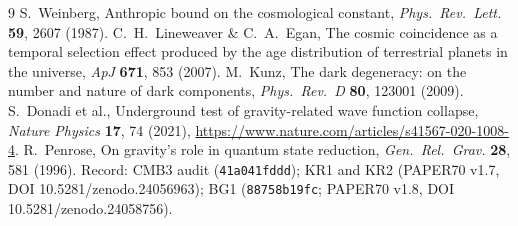 \documentclass[10pt]{article}
\begin{document}
\begin{thebibliography}{9}
 S.~Weinberg, Anthropic bound on the cosmological constant, \emph{Phys.\ Rev.\ Lett.} \textbf{59}, 2607 (1987).
 C.~H.~Lineweaver \& C.~A.~Egan, The cosmic coincidence as a temporal selection effect produced by the age distribution of terrestrial planets in the universe, \emph{ApJ} \textbf{671}, 853 (2007).
 M.~Kunz, The dark degeneracy: on the number and nature of dark components, \emph{Phys.\ Rev.\ D} \textbf{80}, 123001 (2009).
 S.~Donadi et al., Underground test of gravity-related wave function collapse, \emph{Nature Physics} \textbf{17}, 74 (2021), \url{https://www.nature.com/articles/s41567-020-1008-4}.
 R.~Penrose, On gravity's role in quantum state reduction, \emph{Gen.\ Rel.\ Grav.} \textbf{28}, 581 (1996).
 Record: CMB3 audit (\texttt{41a041fddd}); KR1 and KR2 (PAPER70 v1.7, DOI 10.5281/zenodo.24056963); BG1 (\texttt{88758b19fc}; PAPER70 v1.8, DOI 10.5281/zenodo.24058756).
\end{thebibliography}
\end{document}

